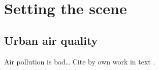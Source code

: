 
\section{Setting the scene}

\subsection{Urban air quality}

Air pollution is bad\dots \supercite{Fenger1999, Fenger2009} Cite by own work in text \citet{Grange2017c}. 
